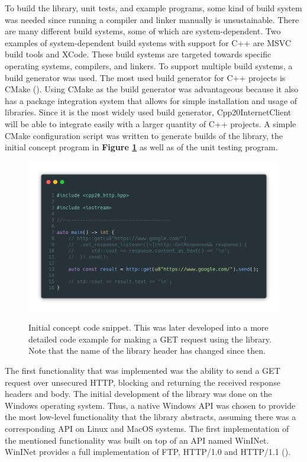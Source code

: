 \documentclass[12pt, a4paper]{article}
\begin{document}
To build the library, unit tests, and example programs, some kind of build system was needed since running a compiler and linker manually is unsustainable. There are many different build systems, some of which are system-dependent. Two examples of system-dependent build systems with support for C++ are MSVC build tools and XCode. These build systems are targeted towards specific operating systems, compilers, and linkers. To support multiple build systems, a build generator was used. The most used build generator for C++ projects is CMake (\cite{DeveloperStatistics}). Using CMake as the build generator was advantageous because it also has a package integration system that allows for simple installation and usage of libraries. Since it is the most widely used build generator, Cpp20InternetClient will be able to integrate easily with a larger quantity of C++ projects. A simple CMake configuration script was written to generate builds of the library, the initial concept program in \textbf{Figure \ref{fig:concept_snippet}} as well as of the unit testing program.

\begin{figure}[hp]
	\centering
	\caption{Initial concept code snippet. This was later developed into a more detailed code example for making a GET request using the library. Note that the name of the library header has changed since then.}
	\includegraphics[width=\textwidth]{concept_snippet}
	\label{fig:concept_snippet}
\end{figure}

The first functionality that was implemented was the ability to send a GET request over unsecured HTTP, blocking and returning the received response headers and body. The initial development of the library was done on the Windows operating system. Thus, a native Windows API was chosen to provide the most low-level functionality that the library abstracts, assuming there was a corresponding API on Linux and MacOS systems. The first implementation of the mentioned functionality was built on top of an API named WinINet. WinINet provides a full implementation of FTP, HTTP/1.0 and HTTP/1.1 (\cite{MicrosoftWinINet}). 
\end{document}
